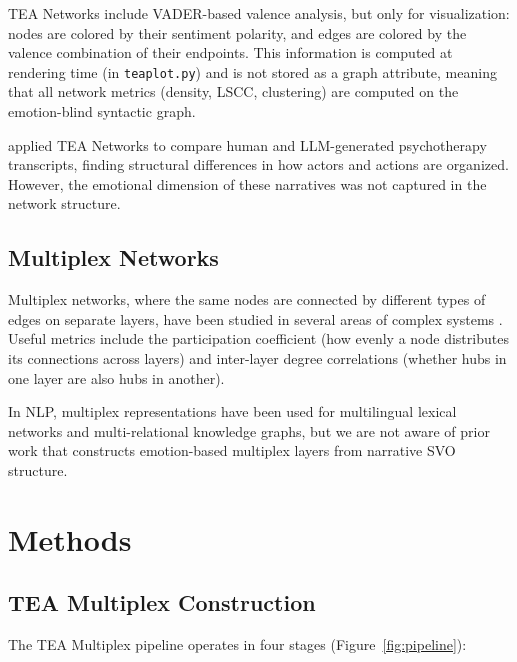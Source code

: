 \documentclass[11pt,a4paper]{article}
\begin{document}
TEA Networks include VADER-based valence analysis, but only for visualization: nodes are colored by their sentiment polarity, and edges are colored by the valence combination of their endpoints.  This information is computed at rendering time (in \texttt{teaplot.py}) and is not stored as a graph attribute, meaning that all network metrics (density, LSCC, clustering) are computed on the emotion-blind syntactic graph.

\citet{franchini2026tea} applied TEA Networks to compare human and LLM-generated psychotherapy transcripts, finding structural differences in how actors and actions are organized.  However, the emotional dimension of these narratives was not captured in the network structure.

\subsection{Multiplex Networks}

Multiplex networks, where the same nodes are connected by different types of edges on separate layers, have been studied in several areas of complex systems \citep{boccaletti2014multiplex, battiston2014structural}.  Useful metrics include the participation coefficient (how evenly a node distributes its connections across layers) and inter-layer degree correlations (whether hubs in one layer are also hubs in another).

In NLP, multiplex representations have been used for multilingual lexical networks \citep{stella2018multiplex} and multi-relational knowledge graphs, but we are not aware of prior work that constructs emotion-based multiplex layers from narrative SVO structure.


\section{Methods}

\subsection{TEA Multiplex Construction}

The TEA Multiplex pipeline operates in four stages (Figure~\ref{fig:pipeline}):
\end{document}
